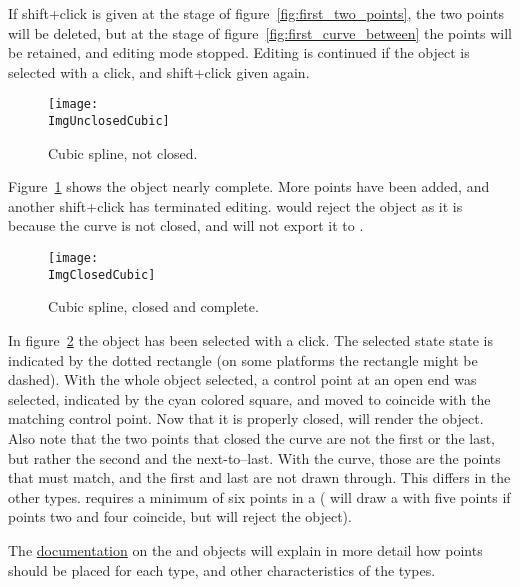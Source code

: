 		If shift+click is given at the stage of
		figure~\ref{fig:first_two_points}, the two points will
		be deleted, but at the stage of
		figure~\ref{fig:first_curve_between} the points will
		be retained, and editing mode stopped. Editing
		is continued if the object is selected with a click,
		and shift+click given again.

		\begin{figure}[htb!]
		\centering
		\texttt{[image: \\ImgUnclosedCubic]}
		\caption{Cubic spline, not closed.}
		\label{fig:first_cubic_unclosed}
		\end{figure}

		Figure~\ref{fig:first_cubic_unclosed} shows the \IXspline{}
		object nearly complete. More points have been added,
		and another shift+click
		has terminated editing. \IXpov{} would reject the object
		as it is because the curve is not closed, and \IXpkg{}
		will not export it to .

		\begin{figure}[htb!]
		\centering
		\texttt{[image: \\ImgClosedCubic]}
		\caption{Cubic spline, closed and complete.}
		\label{fig:first_cubic_closed}
		\end{figure}
		
		In figure~\ref{fig:first_cubic_closed} the object has
		been selected with a click. The selected state state is
		indicated by the dotted rectangle (on some platforms the
		rectangle might be dashed). With the whole object
		selected, a control point at an open end was selected,
		indicated by the cyan colored square, and moved to coincide
		with the matching control point. Now that it
		is properly closed, \IXpov{} will render the object.
		Also note that the two points that closed the curve are
		not the first or the last, but rather the second and
		the next-to--last. With the \IXcubic{} \IXspline{} curve, those
		are the points that must match, and the first and last
		are not drawn through. This differs in the other
		\IXspline{} types. \IXpov{} requires a minimum of six
		points in a \IXcubic{} \IXspline{} (\IXpkg{} will draw a \IXcubic{}
		\IXspline{} with five points if points two and four coincide,
		but \IXpov{} will reject the object).
		
		The
		\IXpov{} \href{\URLPOVdocs}{documentation}
		on the
		\href{\URLPOVdocsLathe}{\IXlathe{}}
		and
		\href{\URLPOVdocsPrism}{\IXprism{}}
		objects will explain in more detail how points
		should be placed for each \IXspline{} type, and other
		characteristics of the types.
		
